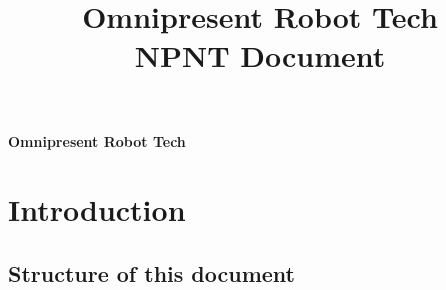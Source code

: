 \documentclass[18pt]{article}
\title{\textbf{Omnipresent Robot Tech \\NPNT Document}}
\begin{document}
\maketitle
\vspace{10cm}
\textbf{Omnipresent Robot Tech}

\newpage



   
   
   
   


\tableofcontents
\newpage



\section{Introduction}

\subsection{Structure of this document}
\end{document}
